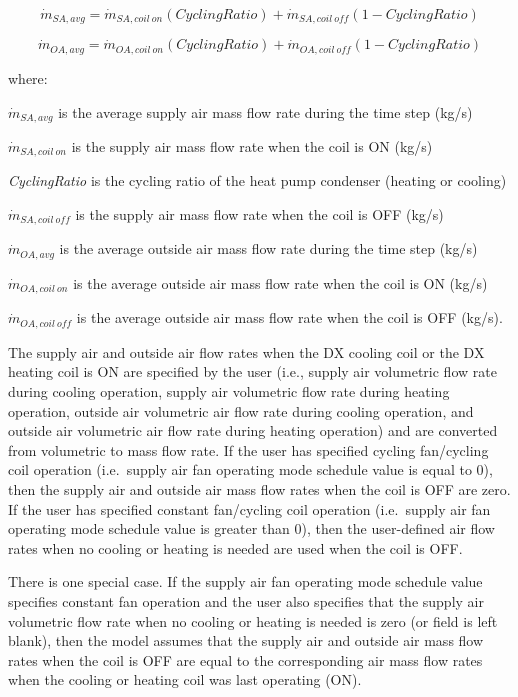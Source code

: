 \begin{equation}
  \dot{m}_{SA,avg} = \dot{m}_{SA,coil~on} \left( CyclingRatio \right) + \dot{m}_{SA,coil~off} \left( 1 - CyclingRatio \right)
\end{equation}

\begin{equation}
  \dot{m}_{OA,avg} = \dot{m}_{OA,coil~on} \left( CyclingRatio \right) + \dot{m}_{OA,coil~off} \left( 1 - CyclingRatio \right)
\end{equation}

where:

\(\dot{m}_{SA,avg}\) is the average supply air mass flow rate during the time step (kg/s)

\(\dot{m}_{SA,coil~on}\) is the supply air mass flow rate when the coil is ON (kg/s)

\emph{CyclingRatio} is the cycling ratio of the heat pump condenser (heating or cooling)

\(\dot{m}_{SA,coil~off}\) is the supply air mass flow rate when the coil is OFF (kg/s)

\(\dot{m}_{OA,avg}\) is the average outside air mass flow rate during the time step (kg/s)

\(\dot{m}_{OA,coil~on}\) is the average outside air mass flow rate when the coil is ON (kg/s)

\(\dot{m}_{OA,coil~off}\) is the average outside air mass flow rate when the coil is OFF (kg/s).

The supply air and outside air flow rates when the DX cooling coil or the DX heating coil is ON are specified by the user (i.e., supply air volumetric flow rate during cooling operation, supply air volumetric flow rate during heating operation, outside air volumetric air flow rate during cooling operation, and outside air volumetric air flow rate during heating operation) and are converted from volumetric to mass flow rate. If the user has specified cycling fan/cycling coil operation (i.e.~supply air fan operating mode schedule value is equal to 0), then the supply air and outside air mass flow rates when the coil is OFF are zero. If the user has specified constant fan/cycling coil operation (i.e.~supply air fan operating mode schedule value is greater than 0), then the user-defined air flow rates when no cooling or heating is needed are used when the coil is OFF.

There is one special case. If the supply air fan operating mode schedule value specifies constant fan operation and the user also specifies that the supply air volumetric flow rate when no cooling or heating is needed is zero (or field is left blank), then the model assumes that the supply air and outside air mass flow rates when the coil is OFF are equal to the corresponding air mass flow rates when the cooling or heating coil was last operating (ON).


